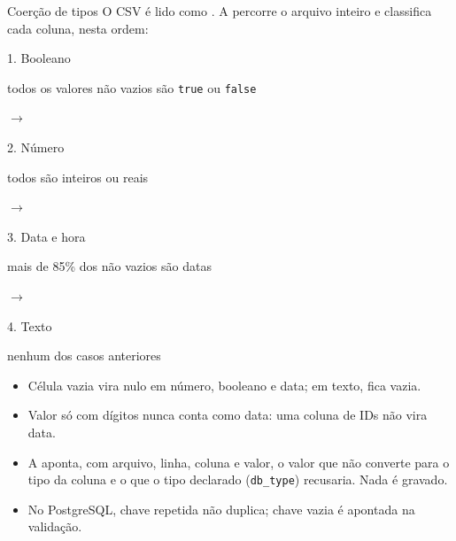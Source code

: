 \newcommand{\bktipo}[2]{%
  \begin{minipage}[c]{0.215\textwidth}\begin{painel}{#1}{}\raggedright #2\end{painel}%
  \end{minipage}}
\newcommand{\bkseta}{\hfill{\color{ufscazul}$\rightarrow$}\hfill}
\begin{frame}{Coerção de tipos}
  \small O CSV é lido como . A  percorre o
  arquivo inteiro e classifica cada coluna, nesta ordem:\par
  \medskip
  \begingroup\footnotesize{}%
  \bktipo{1. Booleano}{todos os valores não vazios são \texttt{true} ou \texttt{false}}\bkseta
  \bktipo{2. Número}{todos são inteiros ou reais}\bkseta
  \bktipo{3. Data e hora}{mais de 85\% dos não vazios são datas}\bkseta
  \bktipo{4. Texto}{nenhum dos casos anteriores}\par
  \endgroup
  \medskip
  \footnotesize
  \begin{itemize}
    \setlength{\itemsep}{2pt}
    \item Célula vazia vira nulo em número, booleano e data; em texto, fica vazia.
    \item Valor só com dígitos nunca conta como data: uma coluna de IDs não vira data.
    \item A  aponta, com arquivo, linha, coluna e valor, o
          valor que não converte para o tipo da coluna e o que o tipo declarado
          (\texttt{db\_type}) recusaria. Nada é gravado.
    \item No PostgreSQL, chave repetida não duplica; chave vazia é apontada na validação.
  \end{itemize}
  \vfill
\end{frame}

